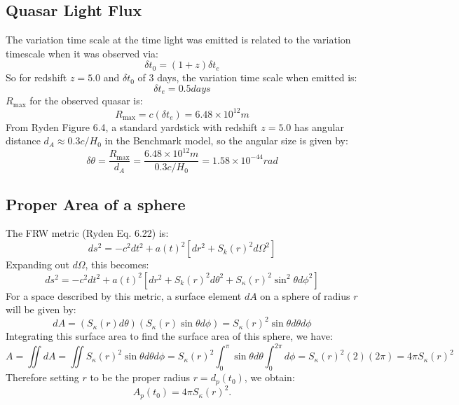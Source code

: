 \subsection{Quasar Light Flux}
The variation time scale at the time light was emitted is related to the variation timescale when it was observed via:
\begin{equation}
    \delta t_0 = (1 + z)\delta t_e
\end{equation}
So for redshift $z = 5.0$ and $\delta t_0$ of 3 days, the variation time scale when emitted is:
\begin{equation}
    \boxed{\delta t_e = 0.5 \si{days}}
\end{equation}
$R_{\text{max}}$ for the observed quasar is:
\begin{equation}
    \boxed{R_{\text{max}} = c(\delta t_e) = 6.48 \times 10^12 \si{m}}
\end{equation}
From Ryden Figure 6.4, a standard yardstick with redshift $z = 5.0$ has angular distance $d_A \approx 0.3c/H_0$ in the Benchmark model, so the angular size is given by:
\begin{equation}
    \boxed{\delta \theta = \frac{R_{\text{max}}}{d_A} = \frac{6.48 \times 10^{12} \si{m}}{0.3c/H_0} = 1.58 \times 10^{-44}\si{rad}}
\end{equation}


\subsection{Proper Area of a sphere}
The FRW metric (Ryden Eq. 6.22) is:
\begin{equation}
    ds^2 = -c^2dt^2 + a(t)^2[dr^2 + S_k(r)^2d\Omega^2]
\end{equation}
Expanding out $d\Omega$, this becomes:
\begin{equation}
    ds^2 = -c^2dt^2 + a(t)^2[dr^2 + S_k(r)^2d\theta^2 + S_\kappa(r)^2\sin^2\theta d\phi^2]
\end{equation}
For a space described by this metric, a surface element $dA$ on a sphere of radius $r$ will be given by:
\begin{equation}
    dA = (S_\kappa(r)d\theta)(S_\kappa(r)\sin\theta d\phi) = S_\kappa(r)^2 \sin\theta d\theta d\phi
\end{equation}
Integrating this surface area to find the surface area of this sphere, we have:
\begin{equation}
    A = \iint dA = \iint S_\kappa(r)^2 \sin\theta d\theta d\phi = S_\kappa(r)^2 \int_{0}^{\pi}\sin\theta d\theta \int_{0}^{2\pi}d\phi = S_\kappa(r)^2(2)(2\pi) = 4\pi S_\kappa(r)^2
\end{equation}
Therefore setting $r$ to be the proper radius $r = d_p(t_0)$, we obtain:
\begin{equation}
    \boxed{A_p(t_0) = 4\pi S_\kappa(r)^2}.
\end{equation}

